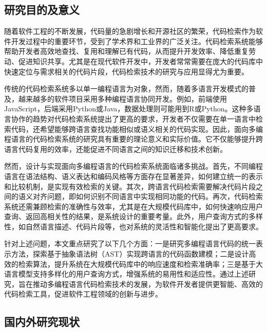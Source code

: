 \documentclass[UTF8,a4paper,12pt]{ctexart}
\numberwithin{equation}{section}
\begin{document}
\subsection{研究目的及意义}
随着软件工程的不断发展，代码量的急剧增长和开源社区的繁荣，代码检索作为软件开发过程中的重要环节，受到了学术界和工业界的广泛关注。代码检索系统能够帮助开发者高效地查找、复用和理解已有代码，从而提升开发效率、降低重复劳动、促进知识共享。尤其是在现代软件开发中，开发者常常需要在庞大的代码库中快速定位与需求相关的代码片段，代码检索技术的研究与应用显得尤为重要。\par
传统的代码检索系统多以单一编程语言为对象，然而，随着多语言开发模式的普及，越来越多的软件项目采用多种编程语言协同开发。例如，前端使用JavaScript，后端采用Python或Java，数据处理则可能用到R或Python。这种多语言协作的趋势对代码检索系统提出了更高的要求，开发者不仅需要在单一语言中检索代码，还希望能够跨语言查找功能相似或语义相关的代码实现。因此，面向多编程语言的代码检索系统的研究具有重要的理论意义和实际价值。它不仅能够提升跨语言代码复用的效率，还能促进不同语言之间的知识迁移和技术创新。\par
然而，设计与实现面向多编程语言的代码检索系统面临诸多挑战。首先，不同编程语言在语法结构、语义表达和编码风格等方面存在显著差异，如何建立统一的表示和比较机制，是实现有效检索的关键。其次，跨语言代码检索需要解决代码片段之间的语义对齐问题，即如何识别不同语言中实现相同功能的代码。再次，代码检索系统还需兼顾检索的准确性与效率，尤其是在大规模代码库中，如何快速响应用户查询、返回高相关性的结果，是系统设计的重要考量。此外，用户查询方式的多样性，如自然语言描述、代码片段等，也对系统的灵活性和智能化提出了更高要求。\par
针对上述问题，本文重点研究了以下几个方面：一是研究多编程语言代码的统一表示方法，探索基于抽象语法树（AST）实现跨语言的代码函数建模；二是设计高效的检索算法，提升系统在大规模代码库中的响应速度和检索准确率；三是基于大语言模型支持多样化的用户查询方式，增强系统的易用性和适应性。通过上述研究，旨在推动多编程语言代码检索技术的发展，为软件开发者提供更智能、高效的代码检索工具，促进软件工程领域的创新与进步。\par

\subsection{国内外研究现状}
\end{document}
